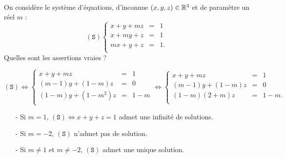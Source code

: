 \begin{question}
On considère le système d'équations, d'inconnue $(x,y,z)\in \mathbb{R}^3$ et de paramètre un réel  $m$ : 
$$(\mathtt{S})  
\left\{\begin{array}{rcc}
x+y+mz&=&1\\
x+my+z&=&1\\ 
mx+y+z&=&1.\\
\end{array}\right.$$
Quelles sont les assertions vraies ?
\begin{answers}  
\end{answers}
\begin{explanations} 
$$(\mathtt{S}) \Leftrightarrow  
\left\{\begin{array}{rcc}
x+y+mz&=&1\\
(m-1)y+(1-m)z&=&0\\ 
(1-m)y+(1-m^2)z&=&1-m\\
\end{array}\right. \Leftrightarrow  
\left\{\begin{array}{rcc}
x+y+mz&=&1\\
(m-1)y+(1-m)z&=&0\\ 
(1-m)(2+m)z&=&1-m.\\
\end{array}\right. $$
\begin{enumerate}
\item[-]Si $m=1$, $(\mathtt{S}) \Leftrightarrow  x+y+z=1 $ admet une infinité de solutions.
\item[-]Si $m=-2$, $(\mathtt{S})$ n'admet pas de solution.
\item[-]Si $m\neq 1$ et $m\neq -2$,  $(\mathtt{S})$ admet une unique solution.
\end{enumerate}
\end{explanations}
\end{question}

